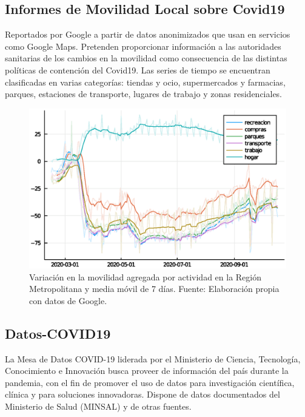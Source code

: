 \subsection{Informes de Movilidad Local sobre Covid19}

Reportados por Google a partir de datos anonimizados que usan en servicios como Google Maps. Pretenden proporcionar información a las autoridades sanitarias de los cambios en la movilidad como consecuencia de las distintas políticas de contención del Covid19. Las series de tiempo se encuentran clasificadas en varias categorías: tiendas y ocio, supermercados y farmacias, parques, estaciones de transporte, lugares de trabajo y zonas residenciales.

\begin{figure}[h]
\centering
\includegraphics[width=\textwidth]{img/metodologia/datos/explorar_movilidad_google_6_1.eps}
\caption{Variación en la movilidad agregada por actividad en la Región Metropolitana y media móvil de 7 días. Fuente: Elaboración propia con datos de Google.}
\label{img:google-movilidad-RM}
\end{figure}

\subsection{Datos-COVID19}

La Mesa de Datos COVID-19 liderada por el Ministerio de Ciencia, Tecnología, Conocimiento e Innovación busca proveer de información del país durante la pandemia, con el fin de promover el uso de datos para investigación científica, clínica y para soluciones innovadoras. Dispone de datos documentados del Ministerio de Salud (MINSAL) y de otras fuentes.

